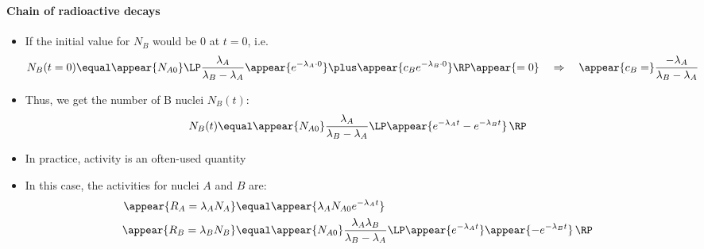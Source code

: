 \begin{frame}
\frametitle{\texorpdfstring{\culine[\sectiontitleulinecolor]{\sectiontitle}}{\sectiontitle} }
\framesubtitle{Chain of radioactive decays}

\begin{itemize}
	\item If the initial value for $N_{B}$ would be 0 at $t=0$, i.e.
\[
N_{B}(t=0)  \equal \appear{N_{A 0}} \LP \frac{\lambda_{A}}{\lambda_{B}-\lambda_{A}} \appear{e^{-\lambda_{A} \cdot 0}}  \plus \appear{c_{B} e^{-\lambda_{B} \cdot 0}} \RP \appear{=0} \quad \Rightarrow \quad \appear{c_{B}=}\frac{-\lambda_{A}}{\lambda_{B}-\lambda_{A}}
\]

\item Thus, we get the number of B nuclei $N_{B}(t)$:
\[
N_{B}(t)  \equal \appear{N_{A 0}} \frac{\lambda_{A}}{\lambda_{B}-\lambda_{A}}
\LP \appear{e^{-\lambda_{A} t}-e^{-\lambda_{B} t}} \,\RP
\]

\item In practice, activity is an often-used quantity

\item In this case, the activities for nuclei $A$ and $B$ are:
$$
\begin{aligned}
\appear{R_A = \lambda_{A} N_{A}} & \equal \appear{\lambda_{A} N_{A 0} e^{-\lambda_{A} t}} \\
\appear{R_B = \lambda_{B} N_{B}} & \equal \appear{N_{A 0}} \frac{\lambda_{A} \lambda_{B}}{\lambda_{B}-\lambda_{A}} \LP \appear{e^{-\lambda_{A} t}}\appear{-e^{-\lambda_{B} t}} \,\RP 
\end{aligned}
$$
\end{itemize}

\endofslide 
\end{frame}


